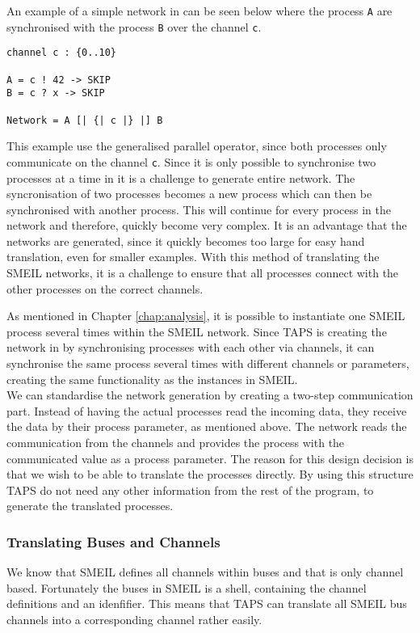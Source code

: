 An example of a simple network in \cspm{} can be seen below where the process \texttt{A} are synchronised with the process \texttt{B} over the channel \texttt{c}.
\begin{verbatim}
channel c : {0..10}

A = c ! 42 -> SKIP
B = c ? x -> SKIP

Network = A [| {| c |} |] B
\end{verbatim}
This example use the generalised parallel operator, since both processes only communicate on the channel \texttt{c}.
Since it is only possible to synchronise two processes at a time in \cspm{} it is a challenge to generate entire network. The syncronisation of two processes becomes a new process which can then be synchronised with another process. This will continue for every process in the network and therefore, quickly become very complex. It is an advantage that the \cspm{} networks are generated, since it quickly becomes too large for easy hand translation, even for smaller examples. With this method of translating the SMEIL networks, it is a challenge to ensure that all processes connect with the other processes on the correct channels.

As mentioned in Chapter \ref{chap:analysis}, it is possible to instantiate one SMEIL process several times within the SMEIL network. Since TAPS is creating the network in \cspm{} by synchronising processes with each other via channels, it can synchronise the same process several times with different channels or parameters, creating the same functionality as the instances in SMEIL.\\

We can standardise the network generation by creating a two-step communication part. Instead of having the actual processes read the incoming data, they receive the data by their process parameter, as mentioned above. The network reads the communication from the channels and provides the process with the communicated value as a process parameter. The reason for this design decision is that we wish to be able to translate the processes directly. By using this structure TAPS do not need any other information from the rest of the program, to generate the translated \cspm{} processes.


\subsubsection{Translating Buses and Channels}
We know that SMEIL defines all channels within buses and that \cspm{} is only channel based. Fortunately the buses in SMEIL is a shell, containing the channel definitions and an idenfifier. This means that TAPS can translate all SMEIL bus channels into a corresponding \cspm{} channel rather easily.\\

